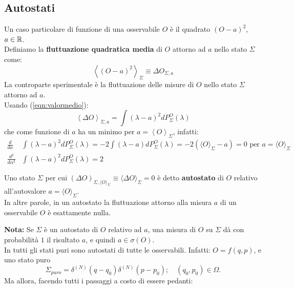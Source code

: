 \documentclass[FisicaTeorica.tex]{subfiles}
\begin{document}
\subsection{Autostati}
Un caso particolare di funzione di una osservabile $O$ è il quadrato $\left(O-a\right)^2$, $a\in\mathbb{R}$.\\
Definiamo la \textbf{fluttuazione quadratica media} di $O$ attorno ad $a$ nello stato $\Sigma$ come:
\[
\left\langle\left(O-a\right)^2\right\rangle_\Sigma\equiv\Delta O_{\Sigma,a}
\]
La controparte sperimentale è la fluttuazione delle misure di $O$ nello stato $\Sigma$ attorno ad $a$.\\
Usando (\ref{eqn:valormedio}):
\begin{equation}
\left\langle\Delta O\right\rangle_{\Sigma,a}=\int\left(\lambda-a\right)^2 dP_\Sigma^O\left(\lambda\right)
\label{eqn:fluttuamedia}
\end{equation}
che come funzione di $a$ ha un minimo per $a=\left\langle O\right\rangle_\Sigma$, infatti:
\begin{align*}
    \frac{d}{da}&\int (\lambda-a)^2 dP_\Sigma^O(\lambda) = -2\int (\lambda-a)dP_\Sigma^O(\lambda) = -2(\langle O \rangle_\Sigma -a) = 0 \text{ per } a = \langle O \rangle_\Sigma \\
    \frac{d^2}{d\alpha^2}&\int\left(\lambda-a\right)^2 dP_\Sigma^O\left(\lambda\right)=2
\end{align*}
\begin{dfn}
Uno stato  $\Sigma$ per cui $(\Delta O)_{\Sigma, \langle O \rangle_\Sigma} \equiv \langle \Delta O \rangle_\Sigma = 0$ è detto \textbf{autostato} di $O$ relativo all'autovalore $a = \langle O \rangle_\Sigma$.\\
In altre parole, in un autostato la fluttuazione attorno alla misura $a$ di un osservabile $O$ è esattamente nulla.
\end{dfn}
\textbf{Nota:} Se $\Sigma$ è un autostato di $O$ relativo ad $a$, una misura di $O$ su $\Sigma$ dà con probabilità $1$ il risultato $a$, e quindi $a \in\sigma(O)$.\\
In \textbf{\MC} tutti gli stati puri sono autostati di tutte le osservabili. Infatti: $O=f(q,p)$, e uno stato puro 
\[ \Sigma_{puro}= \delta^{(N)}\left(q-q_0\right)\delta^{\left(N\right)}\left(p-p_0\right); \quad \left(q_0,p_0\right)\in\Omega.
\]
Ma allora, facendo tutti i passaggi a costo di essere pedanti: %
\end{document}
